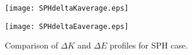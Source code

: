 \documentclass[a4paper,fleqn,usenatbib]{mnras}
\begin{document}
\begin{figure*}
\begin{minipage}{8.5cm}
 \texttt{[image: SPHdeltaKaverage.eps]}
\end{minipage}
\begin{minipage}{8.5cm}
 \texttt{[image: SPHdeltaEaverage.eps]}
\end{minipage}   
 \caption{Comparison of $\Delta K$  and $\Delta E$ profiles for SPH case.}
\label{SPH-comp}
 \end{figure*}
\end{document}
